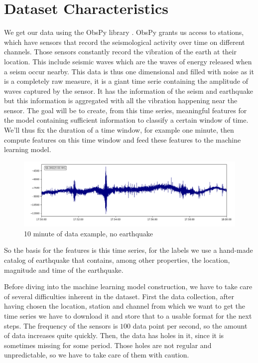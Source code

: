 \documentclass[10pt,conference,compsocconf]{IEEEtran}
\begin{document}
\section{Dataset Characteristics}
We get our data using the ObsPy library \cite{obspy}. ObsPy grants us access to stations, which have sensors that record the seismological activity over time on different channels. Those sensors constantly record  the vibration of the earth at their location. This include seismic waves which are the waves of energy released when a seism occur nearby. This data is thus one dimensional and filled with noise as it is a completely raw measure, it is a giant time serie containing the amplitude of waves captured by the sensor. It has the information of the seism and earthquake but this information is aggregated with all the vibration happening near the sensor. The goal will be to create, from this time series, meaningful features for the model containing sufficient information to classify a certain window of time. We'll thus fix the duration of a time window, for example one minute, then compute features on this time window and feed these features to the machine learning model.

\begin{figure}[h]
  \centering
	\includegraphics[width=\columnwidth]{10min-example-2018-06-30T17:50_1.png}
  \caption{10 minute of data example, no earthquake}
	\label{fig:10min-example}
\end{figure}

So the basis for the features is this time series, for the labels we use a hand-made catalog of earthquake that contains, among other properties, the location, magnitude and time of the earthquake.

Before diving into the machine learning model construction, we have to take care of several difficulties inherent in the dataset.\newline
First the data collection, after having chosen the location, station and channel from which we want to get the time series we have to download it and store that to a usable format for the next steps. The frequency of the sensors is $100$ data point per second, so the amount of data increases quite quickly. Then, the data has holes in it, since it is sometimes missing for some period. Those holes are not regular and unpredictable, so we have to take care of them with caution.
\end{document}
